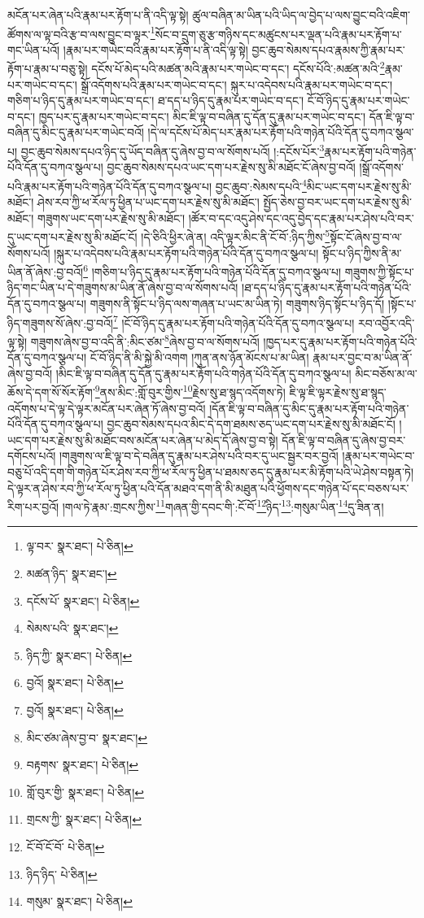 མངོན་པར་ཞེན་པའི་རྣམ་པར་རྟོག་པ་ནི་འདི་ལྟ་སྟེ། ཚུལ་བཞིན་མ་ཡིན་པའི་ཡིད་ལ་བྱེད་པ་ལས་བྱུང་བའི་འཇིག་ཚོགས་ལ་ལྟ་བའི་རྩ་བ་ལས་བྱུང་བ་ལྟར་\footnote{ལྟ་བར་  སྣར་ཐང་།  པེ་ཅིན། }སོང་བ་དྲུག་ཅུ་རྩ་གཉིས་དང་མཚུངས་པར་ལྡན་པའི་རྣམ་པར་རྟོག་པ་གང་ཡིན་པའོ། །རྣམ་པར་གཡེང་བའི་རྣམ་པར་རྟོག་པ་ནི་འདི་ལྟ་སྟེ། བྱང་ཆུབ་སེམས་དཔའ་རྣམས་ཀྱི་རྣམ་པར་རྟོག་པ་རྣམ་པ་བཅུ་སྟེ། དངོས་པོ་མེད་པའི་མཚན་མའི་རྣམ་པར་གཡེང་བ་དང་། དངོས་པོའི་:མཚན་མའི་\footnote{མཚན་ཉིད་  སྣར་ཐང་། }རྣམ་པར་གཡེང་བ་དང་། སྒྲོ་འདོགས་པའི་རྣམ་པར་གཡེང་བ་དང་། སྐུར་པ་འདེབས་པའི་རྣམ་པར་གཡེང་བ་དང་། གཅིག་པ་ཉིད་དུ་རྣམ་པར་གཡེང་བ་དང་། ཐ་དད་པ་ཉིད་དུ་རྣམ་པར་གཡེང་བ་དང་། ངོ་བོ་ཉིད་དུ་རྣམ་པར་གཡེང་བ་དང་། ཁྱད་པར་དུ་རྣམ་པར་གཡེང་བ་དང་། མིང་ཇི་ལྟ་བ་བཞིན་དུ་དོན་དུ་རྣམ་པར་གཡེང་བ་དང་། དོན་ཇི་ལྟ་བ་བཞིན་དུ་མིང་དུ་རྣམ་པར་གཡེང་བའོ། །དེ་ལ་དངོས་པོ་མེད་པར་རྣམ་པར་རྟོག་པའི་གཉེན་པོའི་དོན་དུ་བཀའ་སྩལ་པ། བྱང་ཆུབ་སེམས་དཔའ་ཉིད་དུ་ཡོད་བཞིན་དུ་ཞེས་བྱ་བ་ལ་སོགས་པའོ། །:དངོས་པོར་\footnote{དངོས་པོ་  སྣར་ཐང་།  པེ་ཅིན། }རྣམ་པར་རྟོག་པའི་གཉེན་པོའི་དོན་དུ་བཀའ་སྩལ་པ། བྱང་ཆུབ་སེམས་དཔའ་ཡང་དག་པར་རྗེས་སུ་མི་མཐོང་ངོ་ཞེས་བྱ་བའོ། །སྒྲོ་འདོགས་པའི་རྣམ་པར་རྟོག་པའི་གཉེན་པོའི་དོན་དུ་བཀའ་སྩལ་པ། བྱང་ཆུབ་:སེམས་དཔའི་\footnote{སེམས་པའི་  སྣར་ཐང་། }མིང་ཡང་དག་པར་རྗེས་སུ་མི་མཐོང་། ཤེས་རབ་ཀྱི་ཕ་རོལ་ཏུ་ཕྱིན་པ་ཡང་དག་པར་རྗེས་སུ་མི་མཐོང་། སྤྱོད་ཅེས་བྱ་བར་ཡང་དག་པར་རྗེས་སུ་མི་མཐོང་། གཟུགས་ཡང་དག་པར་རྗེས་སུ་མི་མཐོང་། །ཚོར་བ་དང་འདུ་ཤེས་དང་འདུ་བྱེད་དང་རྣམ་པར་ཤེས་པའི་བར་དུ་ཡང་དག་པར་རྗེས་སུ་མི་མཐོང་ངོ། །དེ་ཅིའི་ཕྱིར་ཞེ་ན། འདི་ལྟར་མིང་ནི་ངོ་བོ་:ཉིད་ཀྱིས་\footnote{ཉིད་ཀྱི་  སྣར་ཐང་།  པེ་ཅིན། }སྟོང་ངོ་ཞེས་བྱ་བ་ལ་སོགས་པའོ། །སྐུར་པ་འདེབས་པའི་རྣམ་པར་རྟོག་པའི་གཉེན་པོའི་དོན་དུ་བཀའ་སྩལ་པ། སྟོང་པ་ཉིད་ཀྱིས་ནི་མ་ཡིན་ནོ་ཞེས་:བྱ་བའོ།\footnote{བྱའོ།  སྣར་ཐང་།  པེ་ཅིན། } །གཅིག་པ་ཉིད་དུ་རྣམ་པར་རྟོག་པའི་གཉེན་པོའི་དོན་དུ་བཀའ་སྩལ་པ། གཟུགས་ཀྱི་སྟོང་པ་ཉིད་གང་ཡིན་པ་དེ་གཟུགས་མ་ཡིན་ནོ་ཞེས་བྱ་བ་ལ་སོགས་པའོ། །ཐ་དད་པ་ཉིད་དུ་རྣམ་པར་རྟོག་པའི་གཉེན་པོའི་དོན་དུ་བཀའ་སྩལ་པ། གཟུགས་ནི་སྟོང་པ་ཉིད་ལས་གཞན་པ་ཡང་མ་ཡིན་ཏེ། གཟུགས་ཉིད་སྟོང་པ་ཉིད་དོ། །སྟོང་པ་ཉིད་གཟུགས་སོ་ཞེས་:བྱ་བའོ།\footnote{བྱའོ།  སྣར་ཐང་།  པེ་ཅིན། } །ངོ་བོ་ཉིད་དུ་རྣམ་པར་རྟོག་པའི་གཉེན་པོའི་དོན་དུ་བཀའ་སྩལ་པ། རབ་འབྱོར་འདི་ལྟ་སྟེ། གཟུགས་ཞེས་བྱ་བ་འདི་ནི་:མིང་ཙམ་\footnote{མིང་ཙམ་ཞེས་བྱ་བ་  སྣར་ཐང་། }ཞེས་བྱ་བ་ལ་སོགས་པའོ། །ཁྱད་པར་དུ་རྣམ་པར་རྟོག་པའི་གཉེན་པོའི་དོན་དུ་བཀའ་སྩལ་པ། ངོ་བོ་ཉིད་ནི་མི་སྐྱེ་མི་འགག །ཀུན་ནས་ཉོན་མོངས་པ་མ་ཡིན། རྣམ་པར་བྱང་བ་མ་ཡིན་ནོ་ཞེས་བྱ་བའོ། །མིང་ཇི་ལྟ་བ་བཞིན་དུ་དོན་དུ་རྣམ་པར་རྟོག་པའི་གཉེན་པོའི་དོན་དུ་བཀའ་སྩལ་པ། མིང་བཅོས་མ་ལ་ཆོས་དེ་དག་སོ་སོར་རྟོག་\footnote{བརྟགས་  སྣར་ཐང་།  པེ་ཅིན། }ནས་མིང་:གློ་བུར་གྱིས་\footnote{གློ་བུར་གྱི་  སྣར་ཐང་།  པེ་ཅིན། }རྗེས་སུ་ཐ་སྙད་འདོགས་ཏེ། ཇི་ལྟ་ཇི་ལྟར་རྗེས་སུ་ཐ་སྙད་འདོགས་པ་དེ་ལྟ་དེ་ལྟར་མངོན་པར་ཞེན་ཏོ་ཞེས་བྱ་བའོ། །དོན་ཇི་ལྟ་བ་བཞིན་དུ་མིང་དུ་རྣམ་པར་རྟོག་པའི་གཉེན་པོའི་དོན་དུ་བཀའ་སྩལ་པ། བྱང་ཆུབ་སེམས་དཔའ་མིང་དེ་དག་ཐམས་ཅད་ཡང་དག་པར་རྗེས་སུ་མི་མཐོང་ངོ། །ཡང་དག་པར་རྗེས་སུ་མི་མཐོང་བས་མངོན་པར་ཞེན་པ་མེད་དོ་ཞེས་བྱ་བ་སྟེ། དོན་ཇི་ལྟ་བ་བཞིན་དུ་ཞེས་བྱ་བར་དགོངས་པའོ། །གཟུགས་ལ་ཇི་ལྟ་བ་དེ་བཞིན་དུ་རྣམ་པར་ཤེས་པའི་བར་དུ་ཡང་སྦྱར་བར་བྱའོ། །རྣམ་པར་གཡེང་བ་བཅུ་པོ་འདི་དག་གི་གཉེན་པོར་ཤེས་རབ་ཀྱི་ཕ་རོལ་ཏུ་ཕྱིན་པ་ཐམས་ཅད་དུ་རྣམ་པར་མི་རྟོག་པའི་ཡེ་ཤེས་བསྟན་ཏེ། དེ་ལྟར་ན་ཤེས་རབ་ཀྱི་ཕ་རོལ་ཏུ་ཕྱིན་པའི་དོན་མཐའ་དག་ནི་མི་མཐུན་པའི་ཕྱོགས་དང་གཉེན་པོ་དང་བཅས་པར་རིག་པར་བྱའོ། །གལ་ཏེ་རྣམ་:གྲངས་ཀྱིས་\footnote{གྲངས་ཀྱི་  སྣར་ཐང་།  པེ་ཅིན། }གཞན་གྱི་དབང་གི་:ངོ་བོ་\footnote{ངོ་བོ་ངོ་བོ་  པེ་ཅིན། }ཉིད་\footnote{ཉིད་ཉིད་  པེ་ཅིན། }:གསུམ་ཡིན་\footnote{གསུམ་  སྣར་ཐང་།  པེ་ཅིན། }དུ་ཟིན་ན། 